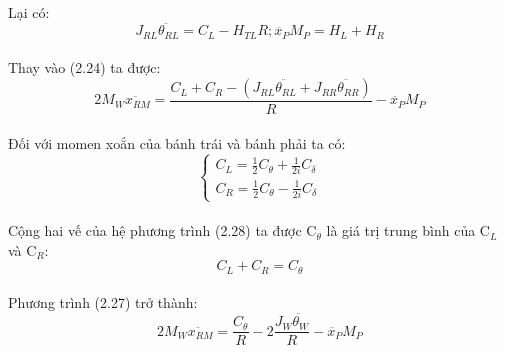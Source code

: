 \paragraph{}Lại có:
\begin{equation}
J_{RL}\ddot{\theta_{RL}} = C_{L} - H_{TL}R ; \ddot{x_{P}}M_{P} = H_{L} + H_{R}
\end{equation}
\paragraph{}Thay vào (2.24) ta được:
\begin{equation}
2M_{W}\ddot{x_{RM}} = \dfrac{C_{L}+C_{R} - (J_{RL}\ddot{\theta_{RL}} + J_{RR}\ddot{\theta_{RR}})}{R} - \ddot{x_{P}}M_{P}
\end{equation}
\paragraph{}Đối với momen xoắn của bánh trái và bánh phải ta có:
\begin{equation}
\begin{cases}
C_{L} = \frac{1}{2}C_{\theta} + \frac{1}{2i}C_{\delta}\\
C_{R} = \frac{1}{2}C_{\theta} - \frac{1}{2i}C_{\delta}
\end{cases}
\end{equation}
\paragraph{}Cộng hai vế của hệ phương trình (2.28) ta được C$_{\theta}$ là giá trị trung bình của C$_{L}$ và C$_{R}$:
\begin{equation}
C_{L} + C_{R} = C_{\theta}
\end{equation}
\paragraph{}Phương trình (2.27) trở thành:
\begin{equation}
2M_{W}\ddot{x_{RM}} = \dfrac{C_{\theta}}{R} - 2\dfrac{J_{W}\ddot{\theta_{W}}}{R} - \ddot{x_{P}}M_{P}
\end{equation}
